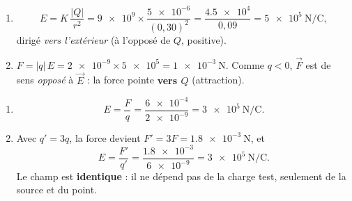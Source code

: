 \documentclass[11pt,a4paper]{article}
\newcommand{\vv}[1]{\vec{#1}}\newcommand{\ds}{\displaystyle}
\begin{document}
\begin{corrige}
\begin{enumerate}[label=\alph*)]
  \item \[ E = K\,\frac{|Q|}{r^2} = \num{9e9}\times\frac{\num{5e-6}}{(0{,}30)^2}
             = \frac{\num{4.5e4}}{0{,}09} = \SI{5e5}{\newton\per\coulomb}, \]
        dirigé \emph{vers l'extérieur} (à l'opposé de $Q$, positive).
  \item $F = |q|\,E = \num{2e-9}\times\num{5e5} = \SI{1e-3}{\newton}$. Comme $q<0$, $\vv{F}$ est de
        sens \emph{opposé} à $\vv{E}$ : la force pointe \textbf{vers $Q$} (attraction).
\end{enumerate}
\end{corrige}

\begin{corrige}
\begin{enumerate}[label=\alph*)]
  \item \[ E = \frac{F}{q} = \frac{\num{6e-4}}{\num{2e-9}} = \SI{3e5}{\newton\per\coulomb}. \]
  \item Avec $q' = 3q$, la force devient $F' = 3F = \SI{1.8e-3}{\newton}$, et
        \[ E = \frac{F'}{q'} = \frac{\num{1.8e-3}}{\num{6e-9}} = \SI{3e5}{\newton\per\coulomb}. \]
        Le champ est \textbf{identique} : il ne dépend pas de la charge test, seulement de la source
        et du point.
\end{enumerate}
\end{corrige}
\end{document}
